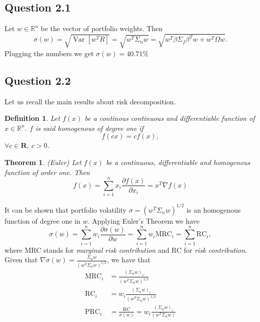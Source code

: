 \documentclass[12pt, a4paper]{article}
\theoremstyle{problemstyle}
\newtheorem{definition}{Definition}[section]
\newtheorem{theorem}{Theorem}[section]
\newcommand{\Var}[1]{\operatorname{Var}\left[#1\right]}
\begin{document}
\subsection{Question 2.1}
Let $w \in \mathbb{R}^n$ be the vector of portfolio weights. Then
\begin{equation}
\sigma(w)=\sqrt{\Var{w^T R}}=\sqrt{w^T\Sigma_n w} = \sqrt{w^T\beta\Sigma_f\beta^Tw + w^T\Omega w}.
\end{equation}
Plugging the numbers we get $\sigma(w)=40.71\%$

\subsection{Question 2.2}
Let us recall the main results about risk decomposition.
\begin{definition}
	Let $f(x)$ be a continous continuous and differentiable function of $x \in \mathbb{R}^n$. $f$ is said homogenous of degree one if 
	\begin{equation}
	f(cx) = cf(x),
	\end{equation}
	$\forall c \in \mathbf{R}$, $c>0$.
\end{definition}

\begin{theorem}(Euler)
	Let $f(x)$ be a continuous, differentiable and homogenous function of order one. Then 
	\begin{equation}
	f(x) = \sum_{i=1}^{n}x_i \frac{\partial f(x)}{\partial x_i} = x^T \nabla f(x)
	\end{equation}
\end{theorem}


It can be shown that portfolio volatility $\sigma = (w^T\Sigma_n w)^{1/2}$ is an homogenous function of degree one in $w$. Applying Euler's Theorem we have 
\begin{equation}
\sigma(w)=\sum_{i=1}^nw_i \frac{\partial \sigma(w)}{\partial w} = \sum_{i=1}^n w_i \text{MRC}_{i} = \sum_{i=1}^n \text{RC}_{i},
\end{equation}
where MRC stands for \textit{marginal risk contribution} and RC for \textit{risk contribution}. Given that $\nabla\sigma(w) = \frac{\Sigma_n w}{(w^T\Sigma_n w)^{1/2}}$, we have that
\begin{align}
\text{MRC}_i & = \frac{(\Sigma_n w)_i}{(w^T\Sigma_n w)^{1/2}}\\
\text{RC}_i & = w_i \frac{(\Sigma_n w)_i}{(w^T\Sigma_n w)^{1/2}}\\
\text{PRC}_i & = \frac{\text{RC}}{\sigma(w)} = w_i \frac{(\Sigma_n w)_i}{(w^T\Sigma_n w)}
\end{align}
\end{document}
